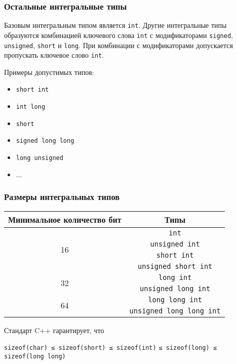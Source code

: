 \documentclass[compress, 8pt]{beamer}
\begin{document}
\begin{frame}[fragile]

    \frametitle{Остальные интегральные типы}

    Базовым интегральным типом является \verb|int|.
    Другие интегральные типы образуются комбинацией ключевого слова \verb|int| с модификаторами
    \verb|signed|, \verb|unsigned|, \verb|short| и \verb|long|.
    При комбинации с модификаторами допускается пропускать ключевое слово \verb|int|.

    \hfill \break
    Примеры допустимых типов:

    \begin{itemize}
        \item \verb|short int|
        \item \verb|int long|
        \item \verb|short|
        \item \verb|signed long long|
        \item \verb|long unsigned|
        \item ...
    \end{itemize}

\end{frame}

\begin{frame}[fragile]

    \frametitle{Размеры интегральных типов}

    \begin{center}
        \begin{tabular}{|c|c|}
            \hline
            Минимальное количество бит & Типы \\
            \hline
            \hline
            \multirow{4}{4em}{16} & \verb|int| \\
            & \verb|unsigned int| \\
            & \verb|short int| \\
            & \verb|unsigned short int| \\
            \hline
            \multirow{2}{4em}{32} & \verb|long int| \\
            & \verb|unsigned long int| \\
            \hline
            \multirow{2}{4em}{64} & \verb|long long int| \\
            & \verb|unsigned long long int| \\
            \hline
        \end{tabular}
    \end{center}

    \hfill \break
    Стандарт C++ гарантирует, что

    \begin{center}
        \verb|sizeof(char) ≤ sizeof(short) ≤ sizeof(int)|
        \verb|≤ sizeof(long) ≤ sizeof(long long)|
    \end{center}

\end{frame}
\end{document}
